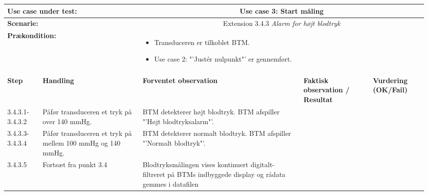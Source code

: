 \begin{tabular}{|p{1cm}|p{3cm}|p{4cm}|p{4cm}|p{2cm}|}
\hline
\multicolumn{2}{|p{3cm}|}{\textbf{Use case under test:}} & \multicolumn{3}{c|}{Use case 3: Start måling} \\\hline

\multicolumn{2}{|p{3cm}|}{\textbf{Scenarie:}} & \multicolumn{3}{c|}{Extension 3.4.3 \textit{Alarm for højt blodtryk}} \\\hline

\multicolumn{2}{|p{3cm}|}{\textbf{Prækondition:}}  & \multicolumn{3}{l|}{\parbox{0.6\textwidth}{
\begin{itemize}[label=$\circ$]
\item Transduceren er tilkoblet BTM.
\item Use case 2: "'Justér nulpunkt"' er gennemført.  
\end{itemize} }}\\\hline

\multicolumn{5}{|c|}{} \\\hline

\textbf{Step} & \textbf{Handling} & \textbf{Forventet observation} & \textbf{Faktisk observation / Resultat} & \textbf{Vurdering (OK/Fail)}\\\hline

3.4.3.1-3.4.3.2 & Påfør transduceren et tryk på over 140 mmHg. & BTM detekterer højt blodtryk. BTM afspiller "'Højt blodtryksalarm"'.  & & 
\\\hline
3.4.3.3-3.4.3.4 & Påfør transduceren et tryk på mellem 100 mmHg og 140 mmHg. & BTM detekterer normalt blodtryk. BTM afspiller "'Normalt blodtryk"'.  & & 
\\\hline
3.4.3.5 & Fortsæt fra punkt 3.4 & Blodtryksmålingen vises kontinuert digitalt-filtreret på BTMs indbyggede display og rådata gemmes i datafilen & & 
\\\hline

\end{tabular}

